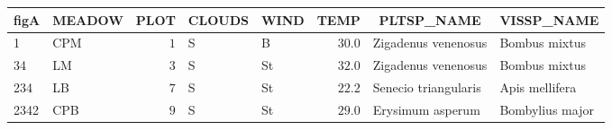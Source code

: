 \begin{table}[!tbp]
\begin{center}
\begin{tabular}{llrllrll}
\hline\hline
\multicolumn{1}{l}{figA}&\multicolumn{1}{c}{MEADOW}&\multicolumn{1}{c}{PLOT}&\multicolumn{1}{c}{CLOUDS}&\multicolumn{1}{c}{WIND}&\multicolumn{1}{c}{TEMP}&\multicolumn{1}{c}{PLTSP_NAME}&\multicolumn{1}{c}{VISSP_NAME}\tabularnewline
\hline
1&CPM&$1$&S&B&$30.0$&Zigadenus venenosus&Bombus mixtus\tabularnewline
34&LM&$3$&S&St&$32.0$&Zigadenus venenosus&Bombus mixtus\tabularnewline
234&LB&$7$&S&St&$22.2$&Senecio triangularis&Apis mellifera\tabularnewline
2342&CPB&$9$&S&St&$29.0$&Erysimum asperum&Bombylius major\tabularnewline
\hline
\end{tabular}\end{center}

\end{table}

